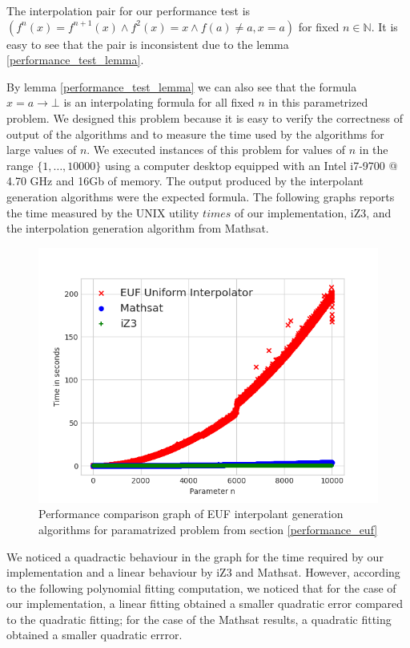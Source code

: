 The interpolation pair for our performance test 
is $(f^n(x) = f^{n+1}(x) \land f^2(x) = x \land f(a) \neq a, x = a)$
for fixed $n \in \mathbb{N}$.
It is easy to see that the pair is inconsistent due to the lemma 
\ref{performance_test_lemma}. 

By lemma \ref{performance_test_lemma}
we can also see that the formula $x = a \rightarrow \bot$ is an 
interpolating formula for all fixed $n$ in this parametrized problem.
We designed this problem because it is easy to verify the 
correctness of output of the algorithms and to measure 
the time used by the algorithms for large values of $n$. 
We executed instances of this problem for values of $n$
in the range $\{1, \dots, 10000\}$ using a computer desktop
equipped with an Intel i7-9700 @ 4.70 GHz and 16Gb of memory. 
The output produced by the interpolant generation algorithms
were the expected formula.
The following graphs reports the time measured by the UNIX
utility $times$ of our implementation, iZ3, and the interpolation 
generation algorithm from Mathsat.

\begin{figure}
  \centering
  \includegraphics[scale=0.9]{figures/eufi_performance_graph}
  \caption{Performance comparison graph of EUF interpolant generation
  algorithms for paramatrized problem from section \ref{performance_euf}} 
  \label{performance_graph_euf}
\end{figure}

We noticed a quadractic behaviour in the graph for the time 
required by our implementation
and a linear behaviour by iZ3 and Mathsat. However, 
according to the following polynomial 
fitting computation, 
we noticed that for the case of our implementation, 
a linear fitting obtained a smaller 
quadratic error compared to the quadratic fitting;  
for the case of the Mathsat
results, a quadratic fitting obtained a smaller 
quadratic errror.

